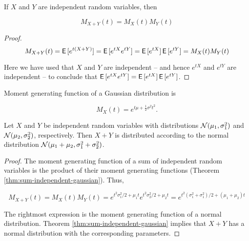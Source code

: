 \begin{thm}
    \citep{mitzenmacher2017probability}\label{thm:sum-independent-gaussian}
    If $X$ and $Y$ are independent random variables, then
    
    \begin{equation}
    M_{X + Y}(t) = M_X(t) M_Y(t)
    \end{equation}
    
    \begin{proof}
        \begin{equation}
        M_{X + Y}(t) = \operatorname{\textsf{E}\,}[e^{t(X + Y)}] = \operatorname{\textsf{E}\,}[e^{tX} e^{tY}] = \operatorname{\textsf{E}\,}[e^{tX}] \operatorname{\textsf{E}\,}[e^{tY}] = M_X(t) M_Y(t)
        \end{equation}
        
        Here we have used that $X$ and $Y$ are independent -- and hence $e^{tX}$ and $e^{tY}$ are independent -- to conclude that $\operatorname{\textsf{E}\,}[e^{tX} e^{tY}] = \operatorname{\textsf{E}\,}[e^{tX}] \operatorname{\textsf{E}\,}[e^{tY}]$. 
    \end{proof}
\end{thm}


\begin{thm}
    Moment generating function of a Gaussian distribution is
    
    \begin{equation}
        M_X(t) = e^{t \mu + \frac{1}{2}\sigma^2 t^2}.
    \end{equation}
\end{thm}

\begin{thm}
    Let $X$ and $Y$ be independent random variables with distributions ${\mathcal{N}}(\mu_1, \sigma_1^2)$ and ${\mathcal{N}}(\mu_2, \sigma_2^2)$, respectively. Then $X + Y$ is distributed according to the normal distribution ${\mathcal{N}}(\mu_1 + \mu_2, \sigma_1^2 + \sigma_2^2)$.
    
    \begin{proof}
    The moment generating function of a sum of independent random variables is the product of their moment generating functions (Theorem \ref{thm:sum-independent-gaussian}). Thus,
    
    \begin{equation}
    M_{X + Y}(t) = M_X(t) M_Y(t) = e^{t^2 \sigma_1^2 / 2 + \mu_1 t} e^{t^2 \sigma_2^2 / 2 + \mu_2 t} = e^{t^2 (\sigma_1^2 + \sigma_1^2) / 2 + (\mu_1 + \mu_2) t}
    \end{equation}
    
    The rightmost expression is the moment generating function of a normal distribution. Theorem \ref{thm:sum-independent-gaussian} implies that $X + Y$ has a normal distribution with the corresponding parameters. 
    \end{proof}
\end{thm}

